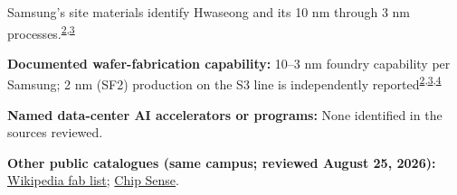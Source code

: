 \begin{minipage}[t][0.90\textheight][t]{\textwidth}
\begin{minipage}[t]{\textwidth}
\begin{minipage}[t]{0.32\textwidth}
\medskip
{\footnotesize Samsung's site materials identify Hwaseong and its 10 nm through 3 nm processes.\nobreak\textsuperscript{\href{\detokenize{https://semiconductor.samsung.com/foundry/manufacturing/manufacturing-sites/}}{\textcolor{accent}{2}},\href{\detokenize{https://semiconductor.samsung.com/news-events/news/samsung-electronics-holds-commemorative-ceremony-for-the-first-3nm-mass-production-shipment/}}{\textcolor{accent}{3}}}\par}
\medskip
{\footnotesize\textbf{Documented wafer-fabrication capability:} 10--3 nm foundry capability per Samsung; 2 nm (SF2) production on the S3 line is independently reported\nobreak\textsuperscript{\href{\detokenize{https://semiconductor.samsung.com/foundry/manufacturing/manufacturing-sites/}}{\textcolor{accent}{2}},\href{\detokenize{https://semiconductor.samsung.com/news-events/news/samsung-electronics-holds-commemorative-ceremony-for-the-first-3nm-mass-production-shipment/}}{\textcolor{accent}{3}},\href{\detokenize{https://www.hankyung.com/article/202602189192i}}{\textcolor{accent}{4}}}\par}
\end{minipage}
\end{minipage}
\par\vspace{0.65em}
\medskip
{\footnotesize\textbf{Named data-center AI accelerators or programs:} None identified in the sources reviewed.\par}
\smallskip
{\sffamily\scriptsize\color{black!62}\textbf{Other public catalogues (same campus; reviewed August 25, 2026):} \href{\detokenize{https://en.wikipedia.org/w/index.php?title=List_of_semiconductor_fabrication_plants&oldid=1370451124}\#\detokenize{Open_plants}}{Wikipedia fab list}; \href{\detokenize{https://github.com/aminalav/chip-sense/blob/93d22afe9e1309a7bebd6c7c96541f069f1d67ac/src/data/fab-sites.json}\#\detokenize{L33-L40}}{Chip Sense}.\par}
\medskip

\end{minipage}
